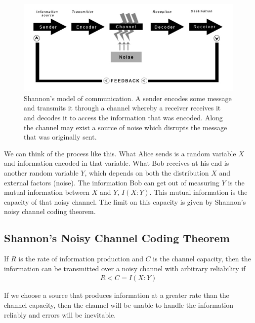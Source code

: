 \begin{figure}[h]
  \begin{center}
    \includegraphics[scale=0.58]{figures/shannon-model-of-communication.png}
    \caption{Shannon's model of communication. A sender encodes some message and transmits it through a channel whereby a receiver receives it and decodes it to access the information that was encoded. Along the channel may exist a source of noise which disrupts the message that was originally sent.}
    \label{fig:}
  \end{center}
\end{figure}

\par We can think of the process like this. What Alice sends is a random variable $X$ and information encoded in that variable. What Bob receives at his end is another random variable $Y$, which depends on both the distribution $X$ and external factors (noise). The information Bob can get out of measuring $Y$ is the mutual information between $X$ and $Y$, $I(X:Y)$. This mutual information is the capacity of that noisy channel. The limit on this capacity is given by Shannon's noisy channel coding theorem.

\subsection{Shannon's Noisy Channel Coding Theorem}
\par If $R$ is the rate of information production and $C$ is the channel capacity, then the information can be transmitted over a noisy channel with arbitrary reliability if
\begin{align*}
R<C=I(X:Y)
\end{align*}
\par If we choose a source that produces information at a greater rate than the channel capacity, then the channel will be unable to handle the information reliably and errors will be inevitable.

